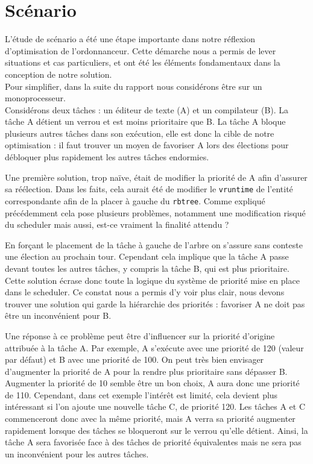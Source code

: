 \section*{Scénario}

L'étude de scénario a été une étape importante dans notre réflexion d'optimisation de l'ordonnanceur. Cette démarche nous a permis de lever situations et cas particuliers, et ont été les éléments fondamentaux dans la conception de notre solution.
\\

Pour simplifier, dans la suite du rapport nous considérons être sur un monoprocesseur.
\\

Considérons deux tâches : un éditeur de texte (A) et un compilateur (B). La tâche A détient un verrou et est moins prioritaire que B. La tâche A bloque plusieurs autres tâches dans son exécution, elle est donc la cible de notre optimisation : il faut trouver un moyen de favoriser A lors des élections pour débloquer plus rapidement les autres tâches endormies.

Une première solution, trop naïve, était de modifier la priorité de A afin d'assurer sa réélection. Dans les faits, cela aurait été de modifier le \verb|vruntime| de l'entité correspondante afin de la placer à gauche du \verb|rbtree|. Comme expliqué précédemment cela pose plusieurs problèmes, notamment une modification risqué du scheduler mais aussi, est-ce vraiment la finalité attendu ?

En forçant le placement de la tâche à gauche de l'arbre on s'assure sans conteste une élection au prochain tour. Cependant cela implique que la tâche A passe devant toutes les autres tâches, y compris la tâche B, qui est plus prioritaire. Cette solution écrase donc toute la logique du système de priorité mise en place dans le scheduler. Ce constat nous a permis d'y voir plus clair, nous devons trouver une solution qui garde la hiérarchie des priorités : favoriser A ne doit pas être un inconvénient pour B.

Une réponse à ce problème peut être d'influencer sur la priorité d'origine attribuée à la tâche A. Par exemple, A s'exécute avec une priorité de 120 (valeur par défaut) et B avec une priorité de 100. On peut très bien envisager d'augmenter la priorité de A pour la rendre plus prioritaire sans dépasser B. Augmenter la priorité de 10 semble être un bon choix, A aura donc une priorité de 110. Cependant, dans cet exemple l'intérêt est limité, cela devient plus intéressant si l'on ajoute une nouvelle tâche C, de priorité 120. Les tâches A et C commenceront donc avec la même priorité, mais A verra sa priorité augmenter rapidement lorsque des tâches se bloqueront sur le verrou qu'elle détient. Ainsi, la tâche A sera favorisée face à des tâches de priorité équivalentes mais ne sera pas un inconvénient pour les autres tâches.

